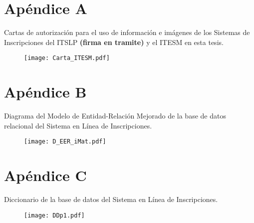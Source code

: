 \chapter*{Apéndice A}\label{aped.A}

Cartas de autorización para el uso de información e imágenes de los Sistemas de Inscripciones del ITSLP {\bf (firma en tramite)} y el ITESM en esta tesis.

\begin{figure}[h]
	\centering
	\texttt{[image: Carta\_ITESM.pdf]}
\end{figure}




\chapter*{Apéndice B}\label{aped.B}

Diagrama del Modelo de Entidad-Relación Mejorado de la base de datos relacional del Sistema en Línea de Inscripciones.


\begin{figure}[h]
	\centering
	\texttt{[image: D\_EER\_iMat.pdf]}
\end{figure}



\chapter*{Apéndice C}\label{aped.C}

Diccionario de la base de datos del Sistema en Línea de Inscripciones.

\begin{figure}[h]
	\centering
	\texttt{[image: DDp1.pdf]}
\end{figure}

